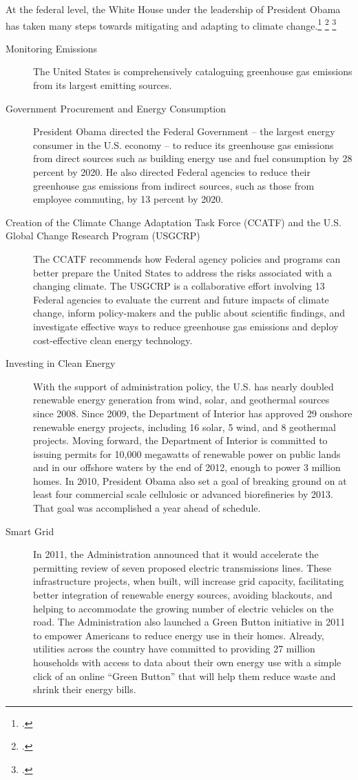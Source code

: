 At the federal level, the White House under the leadership of President Obama has taken many steps towards mitigating and adapting to climate change.\footcite[][]{WHcc2013} \footcite[][]{WHadaptation2013} \footcite[][]{WHenergy}
\begin{description}
	\item [Monitoring Emissions] The United States is comprehensively cataloguing greenhouse gas emissions from its largest emitting sources.
	\item [Government Procurement and Energy Consumption] President Obama directed the Federal Government – the largest energy consumer in the U.S. economy – to reduce its greenhouse gas emissions from direct sources such as building energy use and fuel consumption by 28 percent by 2020. He also directed Federal agencies to reduce their greenhouse gas emissions from indirect sources, such as those from employee commuting, by 13 percent by 2020.
	\item [Creation of the Climate Change Adaptation Task Force (CCATF) and the U.S. Global Change Research Program (USGCRP)] The CCATF recommends how Federal agency policies and programs can better prepare the United States to address the risks associated with a changing climate. The USGCRP is a collaborative effort involving 13 Federal agencies to evaluate the current and future impacts of climate change, inform policy-makers and the public about scientific findings, and investigate effective ways to reduce greenhouse gas emissions and deploy cost-effective clean energy technology.
	\item [Investing in Clean Energy] With the support of administration policy, the U.S. has nearly doubled renewable energy generation from wind, solar, and geothermal sources since 2008. Since 2009, the Department of Interior has approved 29 onshore renewable energy projects, including 16 solar, 5 wind, and 8 geothermal projects. Moving forward, the Department of Interior is committed to issuing permits for 10,000 megawatts of renewable power on public lands and in our offshore waters by the end of 2012, enough to power 3 million homes. In 2010, President Obama also set a goal of breaking ground on at least four commercial scale cellulosic or advanced biorefineries by 2013. That goal was accomplished a year ahead of schedule.
	\item [Smart Grid] In 2011, the Administration announced that it would accelerate the permitting review of seven proposed electric transmissions lines. These infrastructure projects, when built, will increase grid capacity, facilitating better integration of renewable energy sources, avoiding blackouts, and helping to accommodate the growing number of electric vehicles on the road. The Administration also launched a Green Button initiative in 2011 to empower Americans to reduce energy use in their homes. Already, utilities across the country have committed to providing 27 million households with access to data about their own energy use with a simple click of an online ``Green Button'' that will help them reduce waste and shrink their energy bills.

\end{description}
